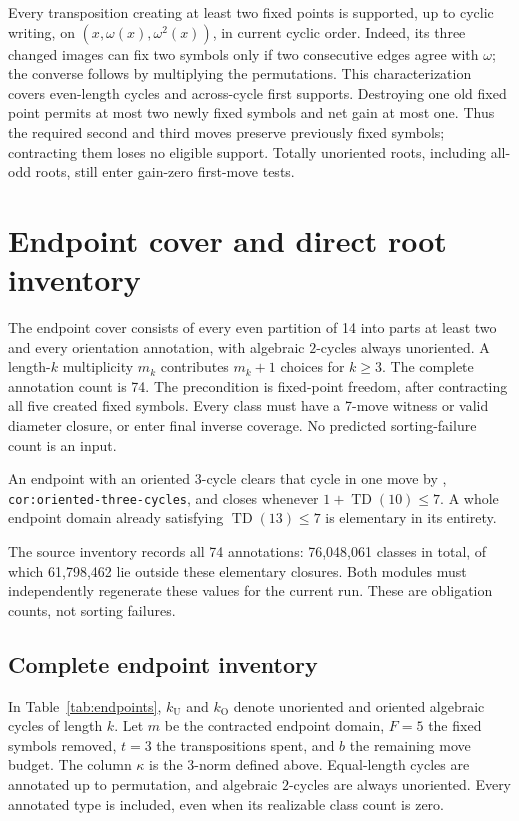 \documentclass[11pt,a4paper]{article}
\newcommand{\TD}{\operatorname{TD}}
\begin{document}
Every transposition creating at least two fixed points is supported, up to
cyclic writing, on $(x,\omega(x),\omega^2(x))$, in current cyclic order. Indeed,
its three changed images can fix two symbols only if two consecutive edges
agree with $\omega$; the converse follows by multiplying the permutations.
This characterization covers even-length cycles and across-cycle first supports.
Destroying one old fixed point permits at most two newly fixed symbols and net
gain at most one. Thus the required second and third moves preserve previously
fixed symbols; contracting them loses no eligible support. Totally unoriented
roots, including all-odd roots, still enter gain-zero first-move tests.

\section{Endpoint cover and direct root inventory}
The endpoint cover consists of every even partition of 14 into parts at
least two and every orientation annotation, with algebraic $2$-cycles always
unoriented. A length-$k$ multiplicity $m_k$ contributes $m_k+1$ choices for
$k\geq3$. The complete annotation count is 74. The precondition is fixed-point
freedom, after contracting all five created fixed symbols. Every class must
have a 7-move witness or valid diameter closure, or enter final inverse
coverage. No predicted sorting-failure count is an input.

An endpoint with an oriented $3$-cycle clears that cycle in one move by
\cite{framework}, \nolinkurl{cor:oriented-three-cycles}, and closes whenever
$1+\TD(10)\leq 7$. A whole endpoint domain already satisfying
$\TD(13)\leq 7$ is elementary in its entirety.

The source inventory records all 74 annotations: 76,048,061 classes in total,
of which 61,798,462 lie outside these elementary closures. Both modules must
independently regenerate these values for the current run. These are obligation
counts, not sorting failures.

\subsection{Complete endpoint inventory}
In Table~\ref{tab:endpoints}, $k_{\mathrm U}$ and $k_{\mathrm O}$ denote
unoriented and oriented algebraic cycles of length $k$. Let $m$ be the
contracted endpoint domain, $F=5$ the fixed symbols removed, $t=3$ the
transpositions spent, and $b$ the remaining move budget. The column $\kappa$
is the $3$-norm defined above. Equal-length cycles are annotated up to
permutation, and algebraic $2$-cycles are always unoriented. Every annotated
type is included, even when its realizable class count is zero.
\end{document}
